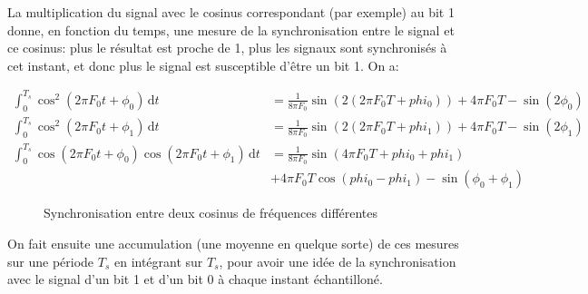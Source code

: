 \documentclass{article}
\begin{document}
La multiplication du signal avec le cosinus correspondant (par exemple) au bit 1 donne, en fonction du temps, une mesure de la synchronisation entre le signal et ce cosinus: plus le résultat est proche de 1, plus les signaux sont synchronisés à cet instant, et donc plus le signal est susceptible d'être un bit 1.
On a:

\begin{align*}
	\int_{0}^{T_s} \cos^2(2 \pi F_0 t + \phi_0) \, \mathrm{d}t  &= \frac{1} {8 \pi F_0} \sin(2(2 \pi F_0 T + phi_0))+4 \pi F_0 T - \sin(2 \phi_0) \\
	\int_{0}^{T_s} \cos^2(2 \pi F_0 t + \phi_1) \, \mathrm{d}t  &= \frac{1} {8 \pi F_0} \sin(2(2 \pi F_0 T + phi_1))+4 \pi F_0 T - \sin(2 \phi_1) \\
	\int_{0}^{T_s} \cos(2 \pi F_0 t + \phi_0) \cos(2 \pi F_0 t + \phi_1)\, \mathrm{d}t  &= \frac{1} {8 \pi F_0} \sin(4 \pi F_0 T + phi_0 + phi_1)\\
											    & + 4 \pi F_0 T \cos(phi_0 - phi_1) - \sin (\phi_0 + \phi_1) 
\end{align*}


\begin{center}
\begin{figure}[H]
	\centering
	\caption{Synchronisation entre deux cosinus de fréquences différentes}
	\label{fig:synchronisation}
\end{figure}
\end{center}

On fait ensuite une accumulation (une moyenne en quelque sorte) de ces mesures sur une période $T_s$ en intégrant sur $T_s$, pour avoir une idée de la synchronisation avec le signal d'un bit 1 et d'un bit 0 à chaque instant échantilloné.

\end{document}
